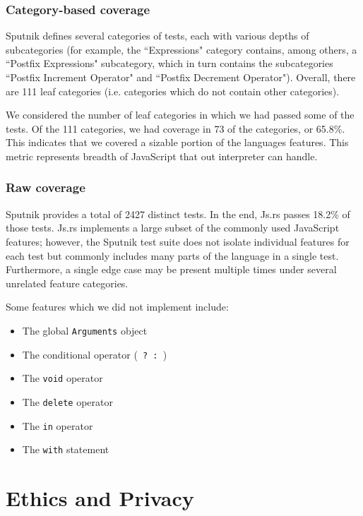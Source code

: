 \documentclass{article}
\begin{document}
\begin{multicols}{2}
\subsubsection*{Category-based coverage}

Sputnik defines several categories of tests, each with various depths of
subcategories (for example, the ``Expressions" category contains, among others,
a ``Postfix Expressions" subcategory, which in turn contains the subcategories
``Postfix Increment Operator" and ``Postfix Decrement Operator"). Overall, there
are 111 leaf categories (i.e. categories which do not contain other
categories). \newline

We considered the number of leaf categories in which we had passed some of the
tests. Of the 111 categories, we had coverage in 73 of the categories, or
65.8\%. This indicates that we covered a sizable portion of the languages
features. This metric represents breadth of JavaScript that out interpreter can
handle.

\subsubsection*{Raw coverage}

Sputnik provides a total of 2427 distinct tests. In the end, Js.rs passes 18.2\%
of those tests. Js.rs implements a large subset of the commonly used
JavaScript features; however, the Sputnik test suite does not isolate individual
features for each test but commonly includes many parts of the language in a
single test. Furthermore, a single edge case may be present multiple times under
several unrelated feature categories.\newline

Some features which we did not implement include:

\begin{itemize}
  \item The global \texttt{Arguments} object
  \item The conditional operator (\texttt{ ? : })
  \item The \texttt{void} operator
  \item The \texttt{delete} operator
  \item The \texttt{in} operator
  \item The \texttt{with} statement
\end{itemize}

\section{Ethics and Privacy}


\end{multicols}
\end{document}
